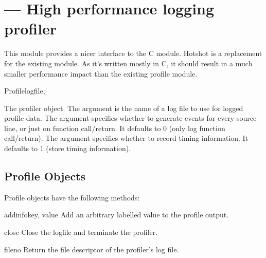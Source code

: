 \section{ ---
         High performance logging profiler}






This module provides a nicer interface to the  C module.
Hotshot is a replacement for the existing  module. As it's
written mostly in C, it should result in a much smaller performance impact 
than the existing profile module.

\begin{classdesc}{Profile}{logfile, }

The profiler object. The argument  is the name of a log file
to use for logged profile data. The argument  specifies whether
to generate events for every source line, or just on function call/return. It
defaults to 0 (only log function call/return). The argument 
specifies whether to record timing information. It defaults to 1 (store timing
information).

\end{classdesc}

\subsection{Profile Objects \label{hotshot-objects}}

Profile objects have the following methods:

\begin{methoddesc}{addinfo}{key, value}
Add an arbitrary labelled value to the profile output.
\end{methoddesc}

\begin{methoddesc}{close}{}
Close the logfile and terminate the profiler.
\end{methoddesc}
 
%
\begin{methoddesc}{fileno}{}
Return the file descriptor of the profiler's log file.
\end{methoddesc}

